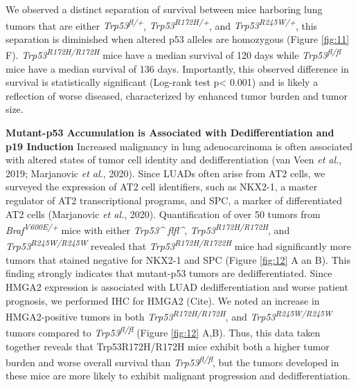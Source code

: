 We observed a distinct separation of survival between mice harboring lung tumors that are either \emph{Trp53\textsuperscript{fl/+}}, \emph{Trp53\textsuperscript{R172H/+}}, and \emph{Trp53\textsuperscript{R245W/+}}, this separation is diminished when altered p53 alleles are homozygous (Figure \ref{fig:11} F). \emph{Trp53\textsuperscript{R172H/R172H}} mice have a median survival of 120 days while \emph{Trp53\textsuperscript{fl/fl}} mice have a median survival of 136 days. Importantly, this observed difference in survival is statistically significant (Log-rank test p\textless{} 0.001) and is likely a reflection of worse diseased, characterized by enhanced tumor burden and tumor size.

\textbf{Mutant-p53 Accumulation is Associated with Dedifferentiation and p19 Induction}
Increased malignancy in lung adenocarcinoma is often associated with altered states of tumor cell identity and dedifferentiation (van Veen \emph{et al.}, 2019; Marjanovic \emph{et al.}, 2020). Since LUADs often arise from AT2 cells, we surveyed the expression of AT2 cell identifiers, such as NKX2-1, a master regulator of AT2 transcriptional programs, and SPC, a marker of differentiated AT2 cells (Marjanovic \emph{et al.}, 2020). Quantification of over 50 tumors from \emph{Braf\textsuperscript{V600E/+}} mice with either \emph{Trp53\^{} flfl\^{}}, \emph{Trp53\textsuperscript{R172H/R172H}}, and \emph{Trp53\textsuperscript{R245W/R245W}} revealed that \emph{Trp53\textsuperscript{R172H/R1722H}} mice had significantly more tumors that stained negative for NKX2-1 and SPC (Figure \ref{fig:12} A an B). This finding strongly indicates that mutant-p53 tumors are dedifferentiated. Since HMGA2 expression is associated with LUAD dedifferentiation and worse patient prognosis, we performed IHC for HMGA2 (Cite). We noted an increase in HMGA2-positive tumors in both \emph{Trp53\textsuperscript{R172H/R172H}}, and \emph{Trp53\textsuperscript{R245W/R245W}} tumors compared to \emph{Trp53\textsuperscript{fl/fl}} (Figure \ref{fig:12} A,B). Thus, this data taken together reveals that Trp53R172H/R172H mice exhibit both a higher tumor burden and worse overall survival than \emph{Trp53\textsuperscript{fl/fl}}, but the tumors developed in these mice are more likely to exhibit malignant progression and dedifferentiation.

